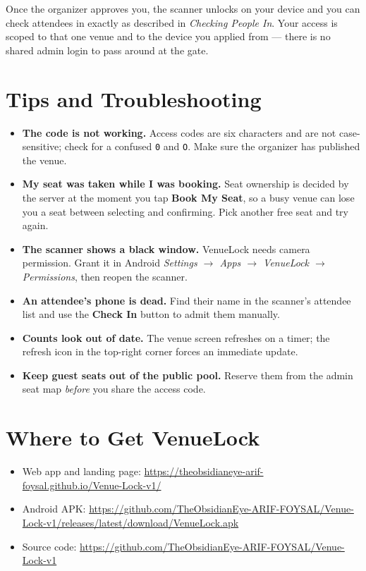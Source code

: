 \documentclass[11pt,a4paper]{article}
\begin{document}
Once the organizer approves you, the scanner unlocks on your device and you
can check attendees in exactly as described in
\textit{Checking People In}. Your access is scoped to that one venue and to
the device you applied from --- there is no shared admin login to pass
around at the gate.

\section{Tips and Troubleshooting}

\begin{itemize}[leftmargin=1.5em]
    \item \textbf{The code is not working.} Access codes are six characters
        and are not case-sensitive; check for a confused \texttt{0} and
        \texttt{O}. Make sure the organizer has published the venue.
    \item \textbf{My seat was taken while I was booking.} Seat ownership is
        decided by the server at the moment you tap \textbf{Book My Seat},
        so a busy venue can lose you a seat between selecting and
        confirming. Pick another free seat and try again.
    \item \textbf{The scanner shows a black window.} VenueLock needs
        camera permission. Grant it in Android
        \textit{Settings $\rightarrow$ Apps $\rightarrow$ VenueLock $\rightarrow$
        Permissions}, then reopen the scanner.
    \item \textbf{An attendee's phone is dead.} Find their name in the
        scanner's attendee list and use the \textbf{Check In} button to
        admit them manually.
    \item \textbf{Counts look out of date.} The venue screen refreshes on a
        timer; the refresh icon in the top-right corner forces an immediate
        update.
    \item \textbf{Keep guest seats out of the public pool.} Reserve them
        from the admin seat map \emph{before} you share the access code.
\end{itemize}

\section{Where to Get VenueLock}

\begin{itemize}[leftmargin=1.5em]
    \item Web app and landing page:
        \url{https://theobsidianeye-arif-foysal.github.io/Venue-Lock-v1/}
    \item Android APK:
        \url{https://github.com/TheObsidianEye-ARIF-FOYSAL/Venue-Lock-v1/releases/latest/download/VenueLock.apk}
    \item Source code:
        \url{https://github.com/TheObsidianEye-ARIF-FOYSAL/Venue-Lock-v1}
\end{itemize}
\end{document}
